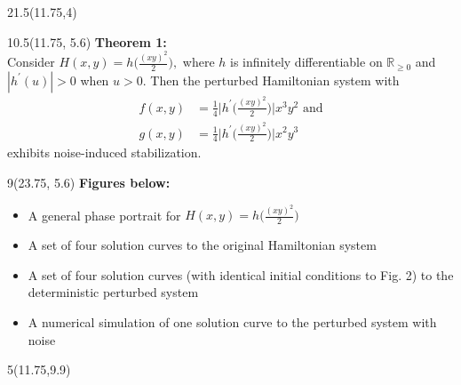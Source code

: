 \documentclass[a0]{a0poster}
\def\LHead#1{\colorbox{deepjunglegreen}{\noindent{\textbf{\Huge\color{white} #1}}\bigskip}}
\begin{document}




\begin{textblock}{21.5}(11.75,4)
\medskip
\LHead{\parbox{21.5in}{\begin{center}Theorems\end{center}}}\\  %
\end{textblock}

\begin{textblock}{10.5}(11.75, 5.6)
\textbf{Theorem 1:}\\
Consider $H(x,y)=h\Big(\frac{(xy)^2}{2}\Big),$ where $h$ is infinitely differentiable on $\mathbb{R}_{\ge0}$ and $|h^\prime(u)| > 0$ when $u > 0$.  Then the perturbed Hamiltonian system with
\begin{align*}
f(x, y) &= \frac{1}{4} \Bigg|h^\prime \Bigg( \frac{(xy)^2}{2}\Bigg)\Bigg| x^{3}y^{2} \text{   and} \\
g(x, y) &= \frac{1}{4} \Bigg|h^\prime \Bigg( \frac{(xy)^2}{2}\Bigg)\Bigg| x^{2}y^{3}
\end{align*}
exhibits noise-induced stabilization.
\end{textblock}


\begin{textblock}{9}(23.75, 5.6)
\textbf{Figures below:}
\begin{itemize}
\item [1.  ] A general phase portrait for $H(x,y) = h\Big(\frac{(xy)^2}{2}\Big)$

\item [2.  ] A set of four solution curves to the original Hamiltonian system

\item [3.  ] A set of four solution curves (with identical initial conditions to Fig. 2) to the deterministic perturbed system

\item [4.  ] A numerical simulation of one solution curve to the perturbed system with noise
\end{itemize}
\end{textblock}


\begin{textblock}{5}(11.75,9.9)
\begin{figure}
\centering
{}
\end{figure}
\end{textblock}
\end{document}
